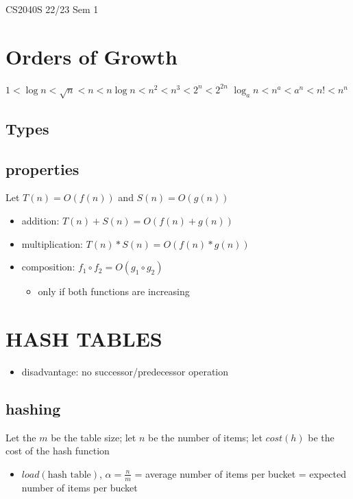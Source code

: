 \documentclass{article}
\begin{document}
\begin{multicols*}{3}
    \noindent
    {\LARGE CS2040S 22/23 Sem 1}
    \section*{Orders of Growth}
    $1 < \log n < \sqrt{n} < n < n \log n < n^2 < n^3 < 2^n < 2^{2n}$
    $\log_a n < n^a < a^n < n! < n^n$

    \subsection*{Types}

    \subsection*{properties}
    Let $T(n) = O(f(n))$ and $S(n) = O(g(n))$
    \begin{itemize}
        \item addition: $T(n) + S(n) = O(f(n) + g(n))$
        \item multiplication: $T(n) * S(n) = O(f(n) * g(n))$
        \item composition: $f_1 \circ f_2 = O(g_1 \circ g_2)$
              \begin{itemize}
                  \item only if both functions are increasing
              \end{itemize}
    \end{itemize}
    \section{HASH TABLES}
    \begin{itemize}
        \item disadvantage: no successor/predecessor operation
    \end{itemize}

    \subsection{hashing}
    Let the $m$ be the table size;
    let $n$ be the number of items;
    let $cost(h)$ be the cost of the hash function

    \begin{itemize}
        \item $load(\text{hash table})$, $\alpha = \frac{n}{m}$
              = average number of items per bucket
              = expected number of items per bucket
    \end{itemize}


\end{multicols*}
\end{document}
